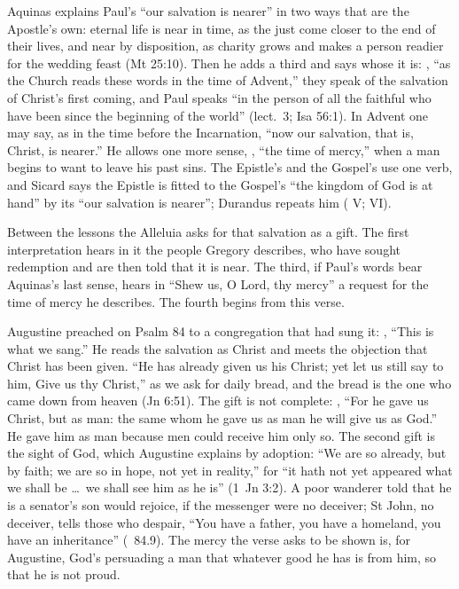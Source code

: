 Aquinas explains Paul's ``our salvation is nearer'' in two ways that are the
Apostle's own: eternal life is near in time, as the just come closer to the
end of their lives, and near by disposition, as charity grows and makes a
person readier for the wedding feast (Mt 25:10). Then he adds a third and says
whose it is: ,
``as the Church reads these words in the time of Advent,'' they speak of the
salvation of Christ's first coming, and Paul speaks ``in the person of all the
faithful who have been since the beginning of the world'' (lect.~3; Isa
56:1). In Advent one may say, as in the time before the Incarnation, ``now our
salvation, that is, Christ, is nearer.'' He allows one more sense,
, ``the time of mercy,'' when a man begins to want
to leave his past sins. The Epistle's  and
the Gospel's  use one verb, and Sicard says the
Epistle is fitted to the Gospel's ``the kingdom of God is at hand'' by its
``our salvation is nearer''; Durandus repeats him ( V;
 VI).

Between the lessons the Alleluia asks for that salvation as a gift. The
first interpretation hears in it the people Gregory describes, who have
sought redemption and are then told that it is near. The third, if Paul's
words bear Aquinas's last sense, hears in ``Shew us, O Lord, thy mercy'' a
request for the time of mercy he describes. The fourth begins from this
verse.

Augustine preached on Psalm 84 to a congregation that had sung it: , ``This is what we sang.'' He reads the salvation as
Christ and meets the objection that Christ has been given. ``He has already
given us his Christ; yet let us still say to him, Give us thy Christ,'' as we
ask for daily bread, and the bread is the one who came down from heaven (Jn
6:51). The gift is not complete: , ``For he
gave us Christ, but as man: the same whom he gave us as man he will give us as
God.'' He gave him as man because men could receive him only so. The second
gift is the sight of God, which Augustine explains by adoption: ``We are so
already, but by faith; we are so in hope, not yet in reality,'' for ``it hath
not yet appeared what we shall be \dots\ we shall see him as he is'' (1~Jn
3:2). A poor wanderer told that he is a senator's son would rejoice, if the
messenger were no deceiver; St John, no deceiver, tells those who despair,
``You have a father, you have a homeland, you have an inheritance''
(~84.9). The mercy the verse asks to be shown is, for
Augustine, God's persuading a man that whatever good he has is from him, so
that he is not proud.

